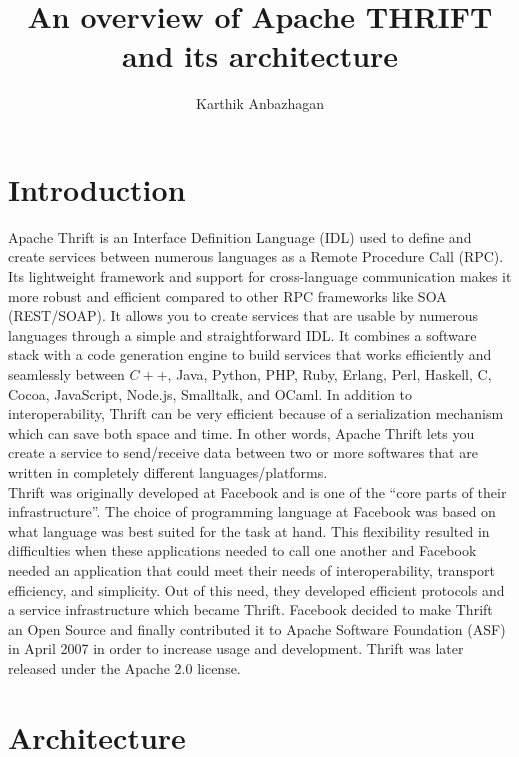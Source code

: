 \documentclass[9pt,twocolumn,twoside]{../../styles/osajnl}
\title{An overview of Apache THRIFT and its architecture}
\author[1]{Karthik Anbazhagan}
\affil[1]{School of Informatics and Computing, Bloomington, IN 47408, U.S.A.}
\affil[*]{Corresponding authors: kartanba@iu.edu}
\begin{document}
\maketitle
\tableofcontents %
\section{Introduction}
Apache Thrift is an Interface Definition Language \cite{www-thrift-idl} (IDL) used to define and create services between numerous languages as a Remote Procedure Call (RPC). Its lightweight framework and support for cross-language communication makes it more robust and efficient compared to other RPC frameworks like SOA \cite{blog-thrift} (REST/SOAP). It allows you to create services that are usable by numerous languages through a simple and straightforward IDL. It combines a software stack with a code generation engine to build services that works efficiently and seamlessly between $C++$, Java, Python, PHP, Ruby, Erlang, Perl, Haskell, C, Cocoa, JavaScript, Node.js, Smalltalk, and OCaml. In addition to interoperability, Thrift can be very efficient because of a serialization mechanism \cite{git-thrift-serial} which can save both space and time. In other words, Apache Thrift lets you create a service to send/receive data between two or more softwares that are written in completely different languages/platforms. \\

Thrift was originally developed at Facebook and is one of the “core parts of their infrastructure”. The choice of programming language at Facebook was based on what language was best suited for the task at hand. This flexibility resulted in difficulties when these applications needed to call one another and Facebook needed an application that could meet their needs of interoperability, transport efficiency, and simplicity. Out of this need, they developed efficient protocols and a service infrastructure which became Thrift. Facebook decided to make Thrift an Open Source and finally contributed it to Apache Software Foundation (ASF) in April 2007 in order to increase usage and development. Thrift was later released under the Apache 2.0 license.

\section{Architecture}
\end{document}
